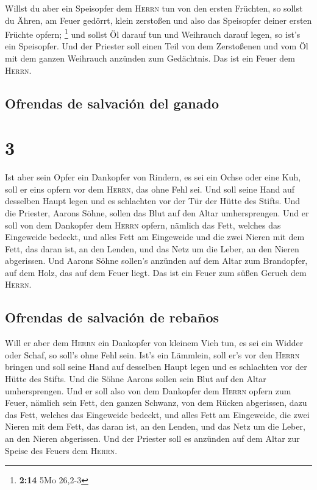  Willst du aber ein Speisopfer dem \textsc{Herrn} tun von
den ersten Früchten, so sollst du Ähren, am Feuer gedörrt, klein
zerstoßen und also das Speisopfer deiner ersten Früchte opfern;
\footnote{\textbf{2:14} 5Mo 26,2-3}  und sollst Öl darauf
tun und Weihrauch darauf legen, so ist's ein Speisopfer. 
Und der Priester soll einen Teil von dem Zerstoßenen und vom Öl mit dem
ganzen Weihrauch anzünden zum Gedächtnis. Das ist ein Feuer dem
\textsc{Herrn}.

\hypertarget{ofrendas-de-salvaciuxf3n-del-ganado}{%
\subsection{Ofrendas de salvación del
ganado}\label{ofrendas-de-salvaciuxf3n-del-ganado}}

\hypertarget{section-2}{%
\section{3}\label{section-2}}

 Ist aber sein Opfer ein Dankopfer von Rindern, es sei ein
Ochse oder eine Kuh, soll er eins opfern vor dem \textsc{Herrn}, das
ohne Fehl sei.  Und soll seine Hand auf desselben Haupt
legen und es schlachten vor der Tür der Hütte des Stifts. Und die
Priester, Aarons Söhne, sollen das Blut auf den Altar umhersprengen.
 Und er soll von dem Dankopfer dem \textsc{Herrn} opfern,
nämlich das Fett, welches das Eingeweide bedeckt, und alles Fett am
Eingeweide  und die zwei Nieren mit dem Fett, das daran
ist, an den Lenden, und das Netz um die Leber, an den Nieren abgerissen.
 Und Aarons Söhne sollen's anzünden auf dem Altar zum
Brandopfer, auf dem Holz, das auf dem Feuer liegt. Das ist ein Feuer zum
süßen Geruch dem \textsc{Herrn}.

\hypertarget{ofrendas-de-salvaciuxf3n-de-rebauxf1os}{%
\subsection{Ofrendas de salvación de
rebaños}\label{ofrendas-de-salvaciuxf3n-de-rebauxf1os}}

 Will er aber dem \textsc{Herrn} ein Dankopfer von kleinem
Vieh tun, es sei ein Widder oder Schaf, so soll's ohne Fehl sein.
 Ist's ein Lämmlein, soll er's vor den \textsc{Herrn}
bringen  und soll seine Hand auf desselben Haupt legen und
es schlachten vor der Hütte des Stifts. Und die Söhne Aarons sollen sein
Blut auf den Altar umhersprengen.  Und er soll also von
dem Dankopfer dem \textsc{Herrn} opfern zum Feuer, nämlich sein Fett,
den ganzen Schwanz, von dem Rücken abgerissen, dazu das Fett, welches
das Eingeweide bedeckt, und alles Fett am Eingeweide, 
die zwei Nieren mit dem Fett, das daran ist, an den Lenden, und das Netz
um die Leber, an den Nieren abgerissen.  Und der Priester
soll es anzünden auf dem Altar zur Speise des Feuers dem \textsc{Herrn}.

